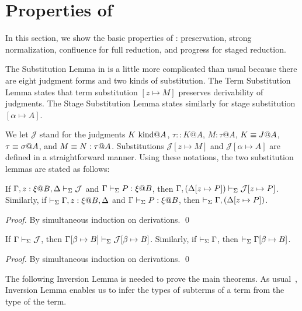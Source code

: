 
\section{Properties of \LMD \label{sec:properties}}

In this section, we show the basic properties of \LMD: preservation, strong
normalization, confluence for full reduction, and progress for staged
reduction.


The Substitution Lemma in \LMD{} is a little more complicated than usual
because there are eight judgment forms and two kinds of substitution.
The Term Substitution Lemma states that term substitution $[z \mapsto M]$
preserves derivability of judgments. The Stage Substitution Lemma
states similarly for stage substitution $[\alpha\mapsto A]$.

We let $\mathcal{J}$ stand for the judgments $K \text{\ kind} @A$, $\tau::K@A$,
$M:\tau@A$, $K \equiv J @ A$, $\tau \equiv \sigma @ A$, and
$M \equiv N : \tau @ A$.  Substitutions $\mathcal{J}[z \mapsto M]$ and
$\mathcal{J}[\alpha \mapsto A]$ are defined in a straightforward
manner.  Using these notations, the two substitution lemmas are stated as follows:

\begin{lemma}
  If $\G, z:\xi@B, \D \V \mathcal{J}$ and $\Gamma\vdash_\Sigma P:\xi @B$, then $\Gamma, (\Delta[z \mapsto P]) \vdash_\Sigma \mathcal{J}[z \mapsto P]$.  Similarly, if $\V \G, z:\xi@B, \D$ and
  $\Gamma\vdash_\Sigma P:\xi @B$, then $\vdash_\Sigma \Gamma, (\Delta[z \mapsto P])$.
\end{lemma}

\begin{proof}
  By simultaneous induction on derivations.
 \qed
\end{proof}

\begin{lemma}
	If $\Gamma \vdash_\Sigma \mathcal{J}$, then $\Gamma[\beta\mapsto B] \vdash_\Sigma \mathcal{J}[\beta\mapsto B]$.  Similarly, if $\vdash_\Sigma \Gamma$, then $\vdash_\Sigma \Gamma[\beta\mapsto B]$.
\end{lemma}

\begin{proof}
  By simultaneous induction on derivations.
  \qed
\end{proof}


The following Inversion Lemma is needed to prove the main theorems.
As usual~\cite{TAPL}, Inversion Lemma enables us to infer the types of subterms of a term from the type of the term.

